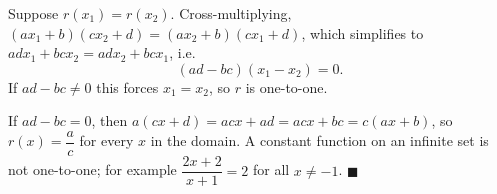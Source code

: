 Suppose $r(x_1)=r(x_2)$. Cross-multiplying, $(ax_1+b)(cx_2+d)=(ax_2+b)(cx_1+d)$, which simplifies to $adx_1+bcx_2=adx_2+bcx_1$, i.e.
\[(ad-bc)(x_1-x_2)=0.\]
If $ad-bc\ne0$ this forces $x_1=x_2$, so $r$ is one-to-one.

If $ad-bc=0$, then $a(cx+d)=acx+ad=acx+bc=c(ax+b)$, so $r(x)=\dfrac ac$ for every $x$ in the domain. A constant function on an infinite set is not one-to-one; for example $\dfrac{2x+2}{x+1}=2$ for all $x\ne-1$. $\blacksquare$
